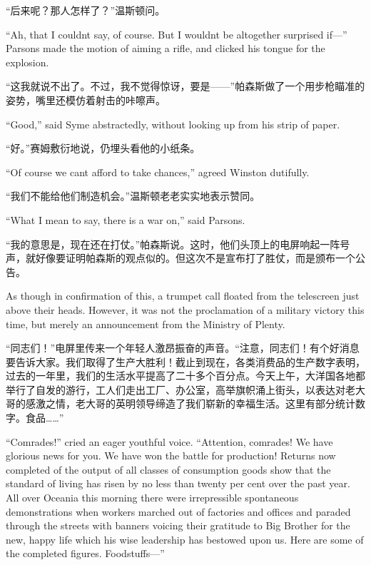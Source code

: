 \begin{paracol}{2}
``后来呢？那人怎样了？''温斯顿问。

\switchcolumn*

``Ah, that I couldn\textquotesingle t say, of course. But I
wouldn\textquotesingle t be altogether surprised if---'' Parsons made the
motion of aiming a rifle, and clicked his tongue for the explosion.

\switchcolumn

``这我就说不出了。不过，我不觉得惊讶，要是——''帕森斯做了一个用步枪瞄准的姿势，嘴里还模仿着射击的咔嚓声。

\switchcolumn*

``Good,'' said Syme abstractedly, without looking up from his strip of
paper.

\switchcolumn

``好。''赛姆敷衍地说，仍埋头看他的小纸条。

\switchcolumn*

``Of course we can\textquotesingle t afford to take chances,'' agreed
Winston dutifully.

\switchcolumn

``我们不能给他们制造机会。''温斯顿老老实实地表示赞同。

\switchcolumn*

``What I mean to say, there is a war on,'' said Parsons.

\switchcolumn

``我的意思是，现在还在打仗。''帕森斯说。这时，他们头顶上的电屏响起一阵号声，就好像要证明帕森斯的观点似的。但这次不是宣布打了胜仗，而是颁布一个公告。

\switchcolumn*

As though in confirmation of this, a trumpet call floated from the
telescreen just above their heads. However, it was not the proclamation
of a military victory this time, but merely an announcement from the
Ministry of Plenty.

\switchcolumn

``同志们！''电屏里传来一个年轻人激昂振奋的声音。``注意，同志们！有个好消息要告诉大家。我们取得了生产大胜利！截止到现在，各类消费品的生产数字表明，过去的一年里，我们的生活水平提高了二十多个百分点。今天上午，大洋国各地都举行了自发的游行，工人们走出工厂、办公室，高举旗帜涌上街头，以表达对老大哥的感激之情，老大哥的英明领导缔造了我们崭新的幸福生活。这里有部分统计数字。食品\ldots\ldots''

\switchcolumn*

``Comrades!'' cried an eager youthful voice. ``Attention, comrades! We have
glorious news for you. We have won the battle for production! Returns
now completed of the output of all classes of consumption goods show
that the standard of living has risen by no less than twenty per cent
over the past year. All over Oceania this morning there were
irrepressible spontaneous demonstrations when workers marched out of
factories and offices and paraded through the streets with banners
voicing their gratitude to Big Brother for the new, happy life which his
wise leadership has bestowed upon us. Here are some of the completed
figures. Foodstuffs---''


\end{paracol}
